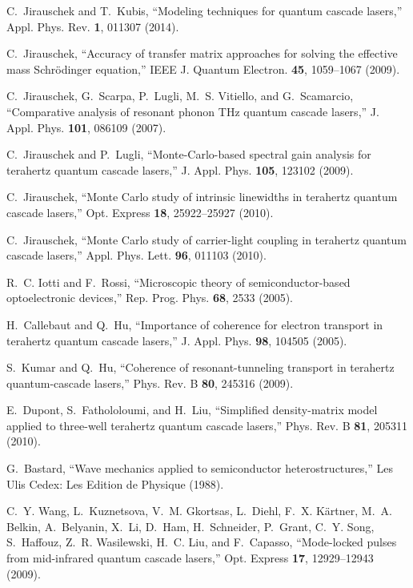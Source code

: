 \documentclass[10pt]{article}
\begin{document}
\begin{thebibliography}{10}
	C.~Jirauschek and T.~Kubis, \enquote{Modeling techniques for quantum cascade
		lasers,} Appl. Phys. Rev. \textbf{1}, 011307 (2014).
	
	C.~{Jirauschek}, \enquote{{Accuracy of transfer matrix approaches for solving
			the effective mass Schr{\"o}dinger equation},} IEEE J. Quantum Electron.
	\textbf{45}, 1059--1067 (2009).
	
	C.~Jirauschek, G.~Scarpa, P.~Lugli, M.~S. Vitiello, and G.~Scamarcio,
	\enquote{{Comparative analysis of resonant phonon THz quantum cascade
			lasers},} J. Appl. Phys. \textbf{101}, 086109 (2007).
	
	C.~Jirauschek and P.~Lugli, \enquote{{Monte-Carlo-based spectral gain analysis
			for terahertz quantum cascade lasers},} J. Appl. Phys. \textbf{105}, 123102
	(2009).
	
	C.~Jirauschek, \enquote{{Monte Carlo study of intrinsic linewidths in terahertz
			quantum cascade lasers},} Opt. Express \textbf{18}, 25922--25927 (2010).
	
	C.~Jirauschek, \enquote{{Monte Carlo study of carrier-light coupling in
			terahertz quantum cascade lasers},} Appl. Phys. Lett. \textbf{96}, 011103
	(2010).
	
	R.~C. Iotti and F.~Rossi, \enquote{Microscopic theory of semiconductor-based
		optoelectronic devices,} Rep. Prog. Phys. \textbf{68}, 2533 (2005).
	
	H.~Callebaut and Q.~Hu, \enquote{Importance of coherence for electron transport
		in terahertz quantum cascade lasers,} J. Appl. Phys. \textbf{98}, 104505
	(2005).
	
	S.~Kumar and Q.~Hu, \enquote{Coherence of resonant-tunneling transport in
		terahertz quantum-cascade lasers,} Phys. Rev. B \textbf{80}, 245316 (2009).
	
	E.~Dupont, S.~Fathololoumi, and H.~Liu, \enquote{Simplified density-matrix
		model applied to three-well terahertz quantum cascade lasers,} Phys. Rev. B
	\textbf{81}, 205311 (2010).
	
	G.~Bastard, \enquote{Wave mechanics applied to semiconductor heterostructures,}
	Les Ulis Cedex: Les Edition de Physique  (1988).
	
	C.~Y. Wang, L.~Kuznetsova, V.~M. Gkortsas, L.~Diehl, F.~X. K\"{a}rtner, M.~A.
	Belkin, A.~Belyanin, X.~Li, D.~Ham, H.~Schneider, P.~Grant, C.~Y. Song,
	S.~Haffouz, Z.~R. Wasilewski, H.~C. Liu, and F.~Capasso, \enquote{Mode-locked
		pulses from mid-infrared quantum cascade lasers,} Opt. Express \textbf{17},
	12929--12943 (2009).
	

\end{thebibliography}
\end{document}
